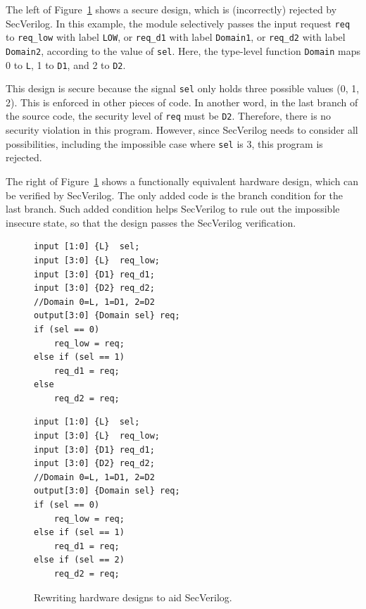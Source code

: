 \documentclass [12pt, oneside, a4paper]{article}
\newcommand{\code}[1]{\texttt{#1}}
\begin{document}
{The left of Figure~\ref{fig:impflow} shows a secure design, which is
(incorrectly) rejected by SecVerilog. In this example, the module
selectively passes the input request \code{req} to \code{req\_low}
with label \code{LOW}, or \code{req\_d1} with label \code{Domain1}, or
\code{req\_d2} with label \code{Domain2}, according to the value of
\code{sel}. Here, the type-level function \code{Domain} maps 0 to
\code{L}, 1 to \code{D1}, and 2 to \code{D2}.

This design is secure because the signal \code{sel} only holds three
possible values (0, 1, 2). This is enforced in other pieces of code.
In another word, in the last branch of the source code, the security
level of \code{req} must be \code{D2}. Therefore, there is no
security violation in this program. However, since SecVerilog needs to
consider all possibilities, including the impossible case where
\code{sel} is 3, this program is rejected.

The right of Figure~\ref{fig:impflow} shows a functionally equivalent
hardware design, which can be verified by SecVerilog. The only added
code is the branch condition for the last branch. Such added condition
helps SecVerilog to rule out the impossible insecure state, so that
the design passes the SecVerilog verification.

\begin{figure}
\begin{minipage}{.49\linewidth}
\begin{lstlisting}[numbers=none, framexleftmargin=0pt]
input [1:0] {L}  sel;
input [3:0] {L}  req_low;
input [3:0] {D1} req_d1;
input [3:0] {D2} req_d2;
//Domain 0=L, 1=D1, 2=D2
output[3:0] {Domain sel} req;
if (sel == 0)
	req_low = req;
else if (sel == 1)
	req_d1 = req;
else
	req_d2 = req;
\end{lstlisting}
\end{minipage}
\hfill
\begin{minipage}{.49\linewidth}
\begin{lstlisting}[numbers=none, framexleftmargin=0pt]
input [1:0] {L}  sel;
input [3:0] {L}  req_low;
input [3:0] {D1} req_d1;
input [3:0] {D2} req_d2;
//Domain 0=L, 1=D1, 2=D2
output[3:0] {Domain sel} req;
if (sel == 0)
	req_low = req;
else if (sel == 1)
	req_d1 = req;
else if (sel == 2)
	req_d2 = req;
\end{lstlisting}
\end{minipage}
\caption{Rewriting hardware designs to aid SecVerilog.}
\label{fig:impflow}
\end{figure}

}
\end{document}

